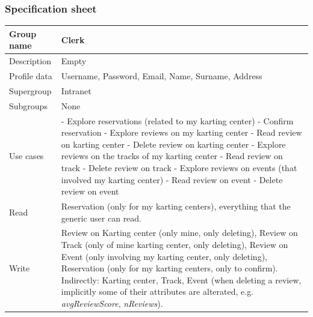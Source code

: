 \documentclass{beamer}
\begin{document}
\begin{frame}
    \frametitle{Specification sheet}
    \begin{table}
        \tiny
        \begin{tabular}{|p{2cm}|p{6cm}|}
        \hline
        Group name & \textbf{Clerk} \\
        \hline
        Description & Empty \\
        \hline
        Profile data & Username, Password, Email, Name, Surname, Address \\
        Supergroup & Intranet \\
        \hline
        Subgroups & None \\
        \hline
        Use cases &
        - Explore reservations (related to my karting center) \newline
        - Confirm reservation \newline
        - Explore reviews on my karting center \newline
        - Read review on karting center \newline
        - Delete review on karting center\newline
        - Explore reviews on the tracks of my karting center \newline
        - Read review on track \newline
        - Delete review on track\newline
        - Explore reviews on events (that involved my karting center) \newline
        - Read review on event \newline
        - Delete review on event\\
        \hline
        Read & Reservation (only for my karting centers), everything 
        that the generic user can read. \\
        \hline
        Write & Review on Karting center (only mine, only deleting), Review on Track (only of mine karting center, only deleting), 
        Review on Event (only involving my karting center, only deleting), Reservation (only for my karting centers, only to confirm). \newline
        Indirectly: Karting center, Track, Event (when deleting a review, implicitly some of their 
        attributes are alterated, e.g. \textit{avgReviewScore}, \textit{nReviews}). \\
        \hline
        \end{tabular}
    \end{table}
\end{frame}
\end{document}
